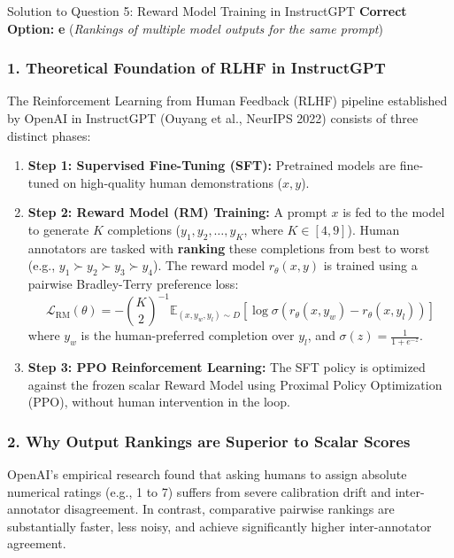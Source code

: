 \documentclass[11pt,a4paper]{article}
\begin{document}
\vspace{10pt}

\begin{solutionbox}{Solution to Question 5: Reward Model Training in InstructGPT}
\textbf{Correct Option:} \textbf{e} (\textit{Rankings of multiple model outputs for the same prompt})

\subsubsection*{1. Theoretical Foundation of RLHF in InstructGPT}
The Reinforcement Learning from Human Feedback (RLHF) pipeline established by OpenAI in InstructGPT (Ouyang et al., NeurIPS 2022) consists of three distinct phases:
\begin{enumerate}[label=\textbf{\arabic*.}]
    \item \textbf{Step 1: Supervised Fine-Tuning (SFT):} Pretrained models are fine-tuned on high-quality human demonstrations ($x, y$).
    \item \textbf{Step 2: Reward Model (RM) Training:} A prompt $x$ is fed to the model to generate $K$ completions ($y_1, y_2, \dots, y_K$, where $K \in [4, 9]$). Human annotators are tasked with \textbf{ranking} these completions from best to worst (e.g., $y_1 \succ y_2 \succ y_3 \succ y_4$). The reward model $r_\theta(x, y)$ is trained using a pairwise Bradley-Terry preference loss:
    \begin{equation}
        \mathcal{L}_{\text{RM}}(\theta) = -\binom{K}{2}^{-1} \mathbb{E}_{(x, y_w, y_l) \sim D} \left[ \log \sigma\left(r_\theta(x, y_w) - r_\theta(x, y_l)\right) \right]
    \end{equation}
    where $y_w$ is the human-preferred completion over $y_l$, and $\sigma(z) = \frac{1}{1 + e^{-z}}$.
    \item \textbf{Step 3: PPO Reinforcement Learning:} The SFT policy is optimized against the frozen scalar Reward Model using Proximal Policy Optimization (PPO), without human intervention in the loop.
\end{enumerate}

\subsubsection*{2. Why Output Rankings are Superior to Scalar Scores}
OpenAI's empirical research found that asking humans to assign absolute numerical ratings (e.g., 1 to 7) suffers from severe calibration drift and inter-annotator disagreement. In contrast, comparative pairwise rankings are substantially faster, less noisy, and achieve significantly higher inter-annotator agreement.


\end{solutionbox}
\end{document}
